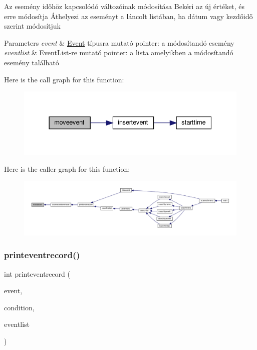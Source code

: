 Az esemény időhöz kapcsolódó változóinak módosítása Bekéri az új értéket, és erre módosítja Áthelyezi az eseményt a láncolt listában, ha dátum vagy kezdőidő szerint módosítjuk 
\begin{DoxyParams}{Parameters}
{\em event} & \hyperlink{struct_event}{Event} típusra mutató pointer\+: a módosítandó esemény \\
\hline
{\em eventlist} & Event\+List-\/re mutató pointer\+: a lista amelyikben a módosítandó esemény található \\
\hline
\end{DoxyParams}
Here is the call graph for this function\+:
\nopagebreak
\begin{figure}[H]
\begin{center}
\leavevmode
\includegraphics[width=337pt]{group__eventrecord_ga610dc34a1e251a16311ca7ac15f64e05_cgraph}
\end{center}
\end{figure}
Here is the caller graph for this function\+:
\nopagebreak
\begin{figure}[H]
\begin{center}
\leavevmode
\includegraphics[width=350pt]{group__eventrecord_ga610dc34a1e251a16311ca7ac15f64e05_icgraph}
\end{center}
\end{figure}
\mbox{\label{group__eventrecord_ga43a7dc247171d596d8d808776d8d40f5}} 
\subsubsection{\texorpdfstring{printeventrecord()}{printeventrecord()}}
{\footnotesize\ttfamily int printeventrecord (\begin{DoxyParamCaption}\item[{\hyperlink{struct_event}{Event} $\ast$}]{event,  }\item[{\hyperlink{struct_search_conditions}{Search\+Conditions}}]{condition,  }\item[{\hyperlink{struct_event_list}{Event\+List} $\ast$}]{eventlist }\end{DoxyParamCaption})}

